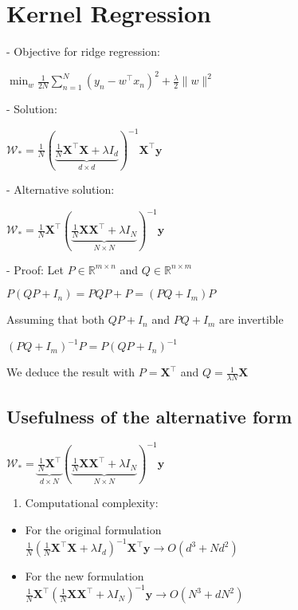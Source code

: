 \section*{Kernel Regression}
- Objective for ridge regression: 

$
\min _{w} \frac{1}{2 N} \sum_{n=1}^{N}\left(y_{n}-w^{\top} x_{n}\right)^{2}+\frac{\lambda}{2}\|w\|^{2}
$

- Solution:

$
\mathcal{W}_{*}=\frac{1}{N}(\underbrace{\frac{1}{N} \mathbf{X}^{\top} \mathbf{X}+\lambda I_{d}}_{d \times d})^{-1} \mathbf{X}^{\top} \mathbf{y}
$

- Alternative solution:

$
\mathcal{W}_{*}=\frac{1}{N} \mathbf{X}^{\top}(\underbrace{\frac{1}{N} \mathbf{X X}^{\top}+\lambda I_{N}}_{N \times N})^{-1} \mathbf{y}
$

- Proof: Let $P \in \mathbb{R}^{m \times n}$ and $Q \in \mathbb{R}^{n \times m}$

$
P\left(Q P+I_{n}\right)=P Q P+P=\left(P Q+I_{m}\right) P
$

Assuming that both $Q P+I_{n}$ and $P Q+I_{m}$ are invertible

$
\left(P Q+I_{m}\right)^{-1} P=P\left(Q P+I_{n}\right)^{-1}
$

We deduce the result with $P=\mathbf{X}^{\top}$ and $Q=\frac{1}{\lambda N} \mathbf{X}$


\subsection*{Usefulness of the alternative form}
$
\mathcal{W}_{*}=\underbrace{\frac{1}{N} \mathbf{X}^{\top}}_{d \times N}(\underbrace{\frac{1}{N} \mathbf{X X}^{\top}+\lambda I_{N}}_{N \times N})^{-1} \mathbf{y}
$

\begin{enumerate}
  \item Computational complexity:
\end{enumerate}

\begin{itemize}
  \item For the original formulation \\ $\frac{1}{N}\left(\frac{1}{N} \mathbf{X}^{\top} \mathbf{X}+\lambda I_{d}\right)^{-1} \mathbf{X}^{\top} \mathbf{y} \rightarrow O\left(d^{3}+N d^{2}\right)$
  \item For the new formulation \\$\frac{1}{N} \mathbf{X}^{\top}\left(\frac{1}{N} \mathbf{X} \mathbf{X}^{\top}+\lambda I_{N}\right)^{-1} \mathbf{y} \rightarrow O\left(N^{3}+d N^{2}\right)$
\end{itemize}

